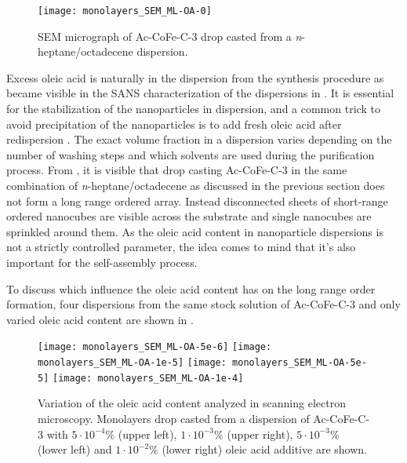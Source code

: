 \documentclass[\main/dresen_thesis.tex]{subfiles}
\begin{document}
  \begin{figure}[!htbp]
    \centering
    \texttt{[image: monolayers\_SEM\_ML-OA-0]}
    \caption{\label{fig:monolayers:preparation:solventVariation:NoOAAddend}SEM micrograph of Ac-CoFe-C-3 drop casted from a \textit{n}-heptane/octadecene dispersion.}
  \end{figure}

  Excess oleic acid is naturally in the dispersion from the synthesis procedure as became visible in the SANS characterization of the dispersions in .
  It is essential for the stabilization of the nanoparticles in dispersion, and a common trick to avoid precipitation of the nanoparticles is to add fresh oleic acid after redispersion \cite{Wetterskog_2014_Preci}.
  The exact volume fraction in a dispersion varies depending on the number of washing steps and which solvents are used during the purification process.
  From , it is visible that drop casting Ac-CoFe-C-3 in the same combination of \textit{n}-heptane/octadecene as discussed in the previous section does not form a long range ordered array.
  Instead disconnected sheets of short-range ordered nanocubes are visible across the substrate and single nanocubes are sprinkled around them.
  As the oleic acid content in nanoparticle dispersions is not a strictly controlled parameter, the idea comes to mind that it's also important for the self-assembly process.

  To discuss which influence the oleic acid content has on the long range order formation, four dispersions from the same stock solution of Ac-CoFe-C-3 and only varied oleic acid content are shown in .

  \begin{figure}[tb]
    \centering
    \texttt{[image: monolayers\_SEM\_ML-OA-5e-6]}
    \texttt{[image: monolayers\_SEM\_ML-OA-1e-5]}
    \texttt{[image: monolayers\_SEM\_ML-OA-5e-5]}
    \texttt{[image: monolayers\_SEM\_ML-OA-1e-4]}
    \caption{\label{fig:monolayers:preparation:solventVariation:OAAddend}Variation of the oleic acid content analyzed in scanning electron microscopy. Monolayers drop casted from a dispersion of Ac-CoFe-C-3 with $5\cdot10^{-4} \unit{\%}$ (upper left), $1\cdot10^{-3} \unit{\%}$ (upper right), $5\cdot10^{-3} \unit{\%}$ (lower left) and $1\cdot10^{-2} \unit{\%}$ (lower right) oleic acid additive are shown.}
  \end{figure}
\end{document}
